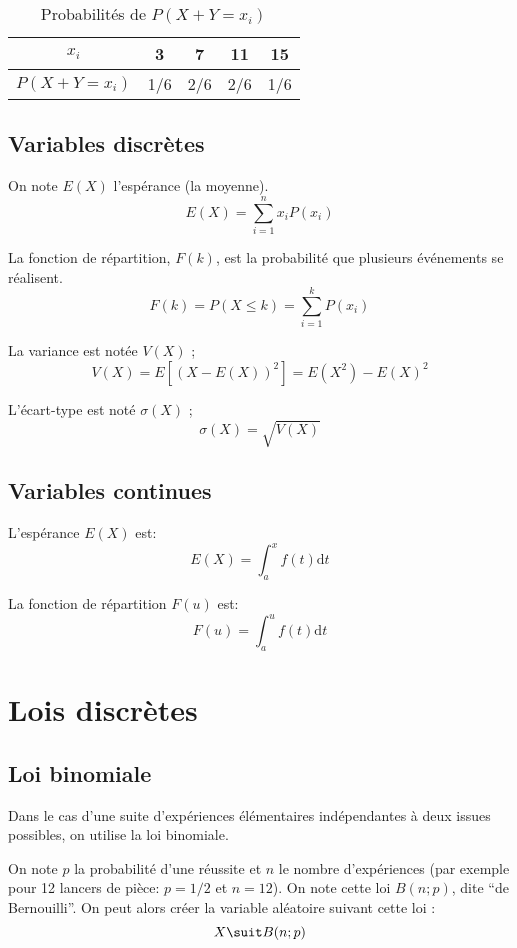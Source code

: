 \documentclass[10pt,a4paper,french]{article}
\begin{document}
\begin{table}[h]
\caption{\label{tab:var-alea-3} Probabilités de $P(X+Y = x_i)$}
\centering
\begin{tabular}{c|cccc}
$x_i$ & 3 & 7 & 11 & 15\\
\hline
$P(X+Y=x_i)$ & 1/6 & 2/6 & 2/6 & 1/6\\
\end{tabular}
\end{table}

\subsection{Variables discrètes}

On note $E(X)$ l'espérance (la moyenne).
\[
E(X) = \sum_{i=1}^n x_i P(x_i)
\]

La fonction de répartition, $F(k)$, est la probabilité que plusieurs événements se réalisent.
\[
F(k) = P(X \leq k) = \sum_{i=1}^k P(x_i)
\]

La variance est notée $V(X)$ ;
\[
V(X) = E[(X-E(X))^2] = E(X^2) - E(X)^2
\]

L'écart-type est noté $\sigma(X)$ ;
\[
\sigma(X) = \sqrt{V(X)}
\]

\subsection{Variables continues}

L'espérance $E(X)$ est:
\[
E(X)= \int_a^x f(t) \text{d} t
\]

La fonction de répartition $F(u)$ est:
\[
F(u) = \int_a^u f(t) \text{d} t
\]

\section{Lois discrètes}

\subsection{Loi binomiale}

Dans le cas d'une suite d'expériences élémentaires indépendantes à deux issues possibles, on utilise la loi binomiale.

On note $p$ la probabilité d'une réussite et $n$ le nombre d'expériences (par exemple pour 12 lancers de pièce: $p=1/2$ et $n=12$). On note cette loi $B(n; p)$, dite ``de Bernouilli''. On peut alors créer la variable aléatoire suivant cette loi : \[ X \suit B(n; p) \]
\end{document}
